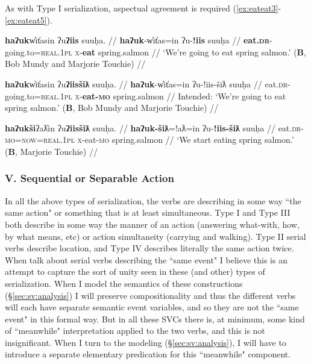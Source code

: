As with Type I serialization, aspectual agreement is required (\ref{ex:eateat3}-\ref{ex:eateat5}).

\ex \label{ex:eateat3}
\begingl
\glpreamble \textbf{haʔuk}w̓it̓asin ʔu\textbf{ʔiis} suuḥa. //
\gla \textbf{haʔuk}-w̓it̓as=in ʔu-\textbf{!iis} suuḥa //
\glb \textbf{eat.\textsc{dr}}-going.to=\textsc{real.1pl} \textsc{x}-\textbf{eat} spring.salmon //
\glft `We're going to eat spring salmon.' (\textbf{B}, Bob Mundy and Marjorie Touchie) //
\endgl
\xe

\ex \label{ex:*eateat4}
\begingl
\glpreamble *\textbf{haʔuk}w̓it̓asin ʔu\textbf{ʔiisšiƛ} suuḥa. //
\gla \textbf{haʔuk}-w̓it̓as=in ʔu-!iis-šiƛ suuḥa //
\glb eat.\textsc{dr}-going.to=\textsc{real.1pl} \textsc{x}-\textbf{eat-\textsc{mo}} spring.salmon //
\glft Intended: `We're going to eat spring salmon.' (\textbf{B}, Bob Mundy and Marjorie Touchie) //
\endgl
\xe

\ex \label{ex:eateat5}
\begingl
\glpreamble \textbf{haʔukši}ʔaƛ̓in ʔu\textbf{ʔiisšiƛ} suuḥa. //
\gla \textbf{haʔuk-šiƛ}=!aƛ=in ʔu-\textbf{!iis-šiƛ} suuḥa //
\glb eat.\textsc{dr}-\textsc{mo}=\textsc{now}=\textsc{real.1pl} \textsc{x}-eat-\textsc{mo} spring.salmon //
\glft `We start eating spring salmon.' (\textbf{B}, Marjorie Touchie) //
\endgl
\xe

\vspace{10pt}

\subsubsection{V. Sequential or Separable Action}

\vspace{10pt}

In all the above types of serialization, the verbs are describing in some way ``the same action" or something that is at least simultaneous. Type I and Type III both describe in some way the manner of an action (answering what-with, how, by what means, etc) or action simultaneity (carrying and walking). Type II serial verbs describe location, and Type IV describes literally the same action twice. When \cite{aikhenvalddixon2006} talk about serial verbs describing the ``same event" I believe this is an attempt to capture the sort of unity seen in these (and other) types of serialization. When I model the semantics of these constructions (\S\ref{sec:sv:analysis}) I will preserve compositionality and thus the different verbs will each have separate semantic event variables, and so they are not the ``same event" in this formal way. But in all these SVCs there is, at minimum, some kind of ``meanwhile" interpretation applied to the two verbs, and this is not insignificant. When I turn to the modeling (\S\ref{sec:sv:analysis}), I will have to introduce a separate elementary predication for this ``meanwhile" component.

